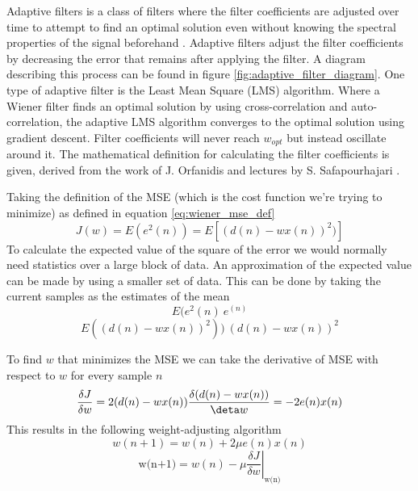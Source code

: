 Adaptive filters is a class of filters where the filter coefficients are adjusted over time to attempt to find an optimal solution even without knowing the spectral properties of the signal beforehand \cite{adaptive_filter_and_applications}. Adaptive filters adjust the filter coefficients by decreasing the error that remains after applying the filter. A diagram describing this process can be found in figure \ref{fig:adaptive_filter_diagram}. 
One type of adaptive filter is the Least Mean Square (LMS) algorithm. Where a Wiener filter finds an optimal solution by using cross-correlation and auto-correlation, the adaptive LMS algorithm converges to the optimal solution using gradient descent. Filter coefficients will never reach $w_{opt}$ but instead oscillate around it. The mathematical definition for calculating the filter coefficients is given, derived from the work of J. Orfanidis \cite{introduction_optimal_signal_processing} and lectures by S. Safapourhajari \cite{lecture_adaptive_filters_2}.

Taking the definition of the MSE (which is the cost function we're trying to minimize) as defined in equation \ref{eq:wiener_mse_def}
\begin{equation}
    J(w) = E(e^2(n)) = E[(d(n) - wx(n))^2)]
\end{equation}
To calculate the expected value of the square of the error we would normally need statistics over a large block of data. An approximation of the expected value can be made by using a smaller set of data. This can be done by taking the current samples as the estimates of the mean
\begin{equation}
    E(e^2(n) ~ e^(n)
\end{equation}
\begin{equation}
    E((d(n) - wx(n))^2)) ~ (d(n) - wx(n))^2
\end{equation}

To find $w$ that minimizes the MSE we can take the derivative of MSE with respect to $w$ for every sample $n$
\begin{equation}
    \frac{\delta J}{\delta w} = 2(d(n) - wx(n)) \frac{\delta(d(n) - wx(n))}{\deta w} = -2e(n)x(n)
\end{equation}
This results in the following weight-adjusting algorithm
\begin{equation}
   w(n+1) = w(n) + 2 \mu e(n)x(n)
\end{equation}
\begin{equation}
    \textrm{w(n+1)}=\left.w(n)-\mu \frac{\delta J}{\delta w}\right\rvert_{\textrm{w(n)}}
\end{equation}



